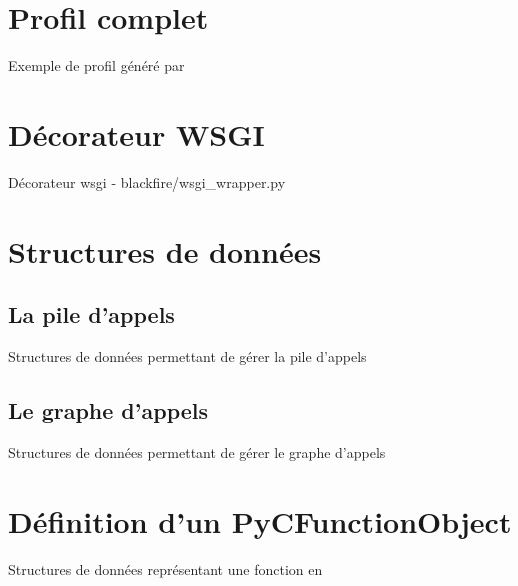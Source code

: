 
  
\chapter{Profil complet}
  \label{app:fullProfile}
  \vspace{-20px}
  \vspace{-20px}
  \begin{listing}[H]
    \caption{Exemple de profil généré par \Blackfire}
  \end{listing}

\chapter{Décorateur WSGI}
  \label{app:decorateurwsgi}
  \begin{listing}[H]
    \caption{Décorateur wsgi - blackfire/wsgi\_wrapper.py}
  \end{listing}
 
\chapter{Structures de données}
  \section{La pile d'appels}
    \label{app:pile_struct}
    \begin{listing}[H]
      \caption{Structures de données permettant de gérer la pile d'appels}
    \end{listing}
  \section{Le graphe d'appels}
    \label{app:graph_struct}
    \begin{listing}[H]
      \caption{Structures de données permettant de gérer le graphe d'appels}
    \end{listing}
 
\chapter{Définition d'un PyCFunctionObject}
  \label{app:PyCFunctionObject}
  \begin{listing}[H]
    \caption{Structures de données représentant une fonction \C en \Python}
  \end{listing}
 
